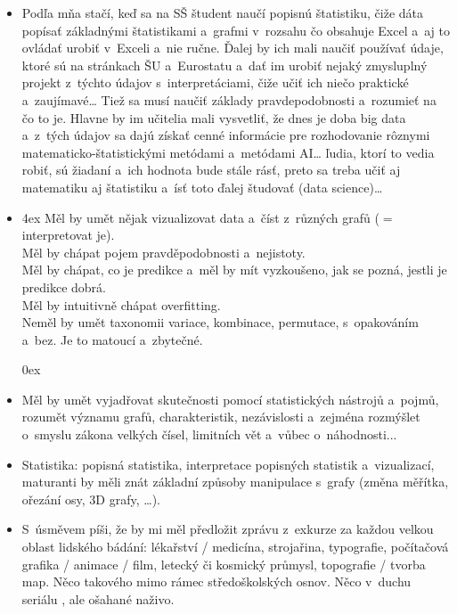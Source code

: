 \begin{itemize}
\item Podľa mňa stačí, keď sa na SŠ študent naučí popisnú štatistiku, čiže dáta popísať základnými štatistikami a~grafmi v~rozsahu čo obsahuje Excel a~aj to ovládať urobiť v~Exceli a~nie ručne. Ďalej by ich mali naučiť používať údaje, ktoré sú na stránkach ŠU a~Eurostatu a~dať im urobiť nejaký zmysluplný projekt z~týchto údajov s~interpretáciami, čiže učiť ich niečo praktické a~zaujímavé\ldots{} Tiež sa musí naučiť základy pravdepodobnosti a~rozumieť na čo to je. Hlavne by im učitelia mali vysvetliť, že dnes je doba big data a~z~tých údajov sa dajú získať cenné informácie pre rozhodovanie rôznymi matematicko-štatistickými metódami a~metódami AI\ldots{} ľudia, ktorí to vedia robiť, sú žiadaní a~ich hodnota bude stále rásť, preto sa treba učiť aj matematiku aj štatistiku a~ísť toto ďalej študovať (data science)\ldots{}

\item[]
\leftskip4ex
\makebox[0pt][r]{$\bullet$\hskip5ex}%
Měl by umět nějak vizualizovat data a~číst z~různých grafů ($=$ interpretovat je).\\
Měl by chápat pojem pravděpodobnosti a~nejistoty.\\
Měl by chápat, co je predikce a~měl by mít vyzkoušeno, jak se pozná, jestli je predikce dobrá.\\
Měl by intuitivně chápat overfitting.\\
Neměl by umět taxonomii variace, kombinace, permutace, s~opakováním a~bez. Je to matoucí a~zbytečné.

\leftskip0ex
\item Měl by umět vyjadřovat skutečnosti pomocí statistických nástrojů a~pojmů, rozumět významu grafů, charakteristik, nezávislosti a~zejména rozmýšlet o~smyslu zákona velkých čísel, limitních vět a~vůbec o~náhodnosti...

\item Statistika: popisná statistika, interpretace popisných statistik a~vizualizací, maturanti by měli znát základní způsoby manipulace s~grafy (změna měřítka, ořezání osy, 3D grafy, \ldots{}).

\item S~úsměvem píši, že by mi měl předložit zprávu z~exkurze za každou velkou oblast lidského bádání: lékařství / medicína, strojařina, typografie, počítačová grafika / animace / film, letecký či kosmický průmysl, topografie / tvorba map. Něco takového mimo rámec středoškolských osnov. Něco v~duchu seriálu , ale ošahané naživo.

\end{itemize}

